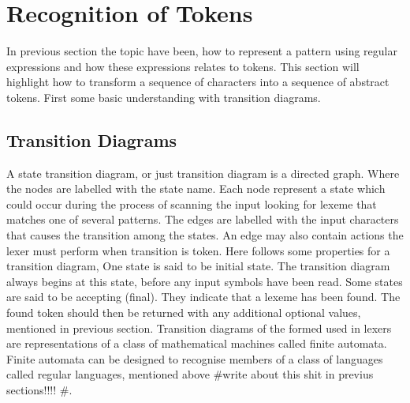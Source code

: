 \section{Recognition of Tokens}
In previous section the topic have been, how to represent a pattern using 
regular expressions and how these expressions relates to tokens. This section 
will highlight how to transform a sequence of characters into a sequence of 
abstract tokens. First some basic understanding with transition diagrams.  
\subsection{Transition Diagrams}
A state transition diagram, or just transition diagram is a directed graph. 
Where the nodes are labelled with the state name. Each node 
represent a state which could occur during the process of scanning the input 
looking for lexeme that matches one of several patterns.\cite{Aho2006} The 
edges are labelled with the input characters that causes the transition among 
the states. An edge may also contain actions the lexer must perform when 
transition is token.\cite{sebesta2012} Here follows some properties for a 
transition diagram, One state is said to be initial state. The transition 
diagram always begins at this state, before any input symbols have been read. 
Some states are said to be accepting (final). They indicate that a lexeme has 
been found. The found token should then be returned with any additional 
optional values, mentioned in previous section.\cite{Aho2006}
Transition diagrams of the formed used in lexers are representations of a class 
of mathematical machines called finite automata. Finite automata can be 
designed to recognise members of a class of languages called regular languages, 
mentioned above \#write about this shit in previus sections!!!! \#.
\cite{sebesta2012} 
